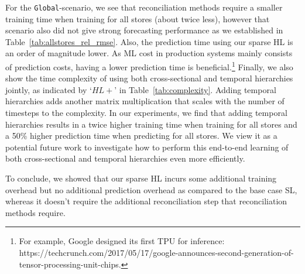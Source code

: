\documentclass[preprint, 3p, times, twocolumn]{elsarticle}
\begin{document}
  For the \texttt{Global}-scenario, we see that reconciliation methods require a smaller training time when training for all stores (about twice less), however that scenario also did not give strong forecasting performance as we established in Table~\ref{tab:allstores_rel_rmse}. Also, the prediction time using our sparse HL is an order of magnitude lower. As ML cost in production systems mainly consists of prediction costs, having a lower prediction time is beneficial.\footnote{For example, Google designed its first TPU for inference: https://techcrunch.com/2017/05/17/google-announces-second-generation-of-tensor-processing-unit-chips.}
  Finally, we also show the time complexity of using both cross-sectional and temporal hierarchies jointly, as indicated by `\(HL+\)' in Table~\ref{tab:complexity}. Adding temporal hierarchies adds another matrix multiplication that scales with the number of timesteps to the complexity. In our experiments, we find that adding temporal hierarchies results in a twice higher training time when training for all stores and a 50\% higher prediction time when predicting for all stores. We view it as a potential future work to investigate how to perform this end-to-end learning of both cross-sectional and temporal hierarchies even more efficiently. 

  To conclude, we showed that our sparse HL incurs some additional training overhead but no additional prediction overhead as compared to the base case SL, whereas it doesn't require the additional reconciliation step that reconciliation methods require.  
\end{document}
